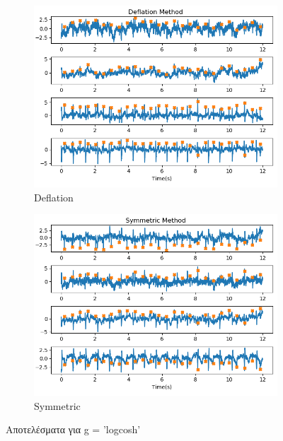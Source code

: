 \begin{figure}[H]
    \centering
    \begin{subfigure}{0.48 \textwidth}
        \centering
       \includegraphics[width=\textwidth]{r01database/logcosh_def.png} \en
        \caption{Deflation} \gr
        \label{fig:5.21a}
    \end{subfigure}
    \hfill
    \begin{subfigure}{0.48 \textwidth}
        \centering
       \includegraphics[width=\textwidth]{r01database/logcosh_sym.png} \en
        \en
        \caption{Symmetric} \gr
        \label{fig:5.21b}
    \end{subfigure}
    \gr
    \caption{Αποτελέσματα για \en g = 'logcosh' \gr}
\end{figure}
